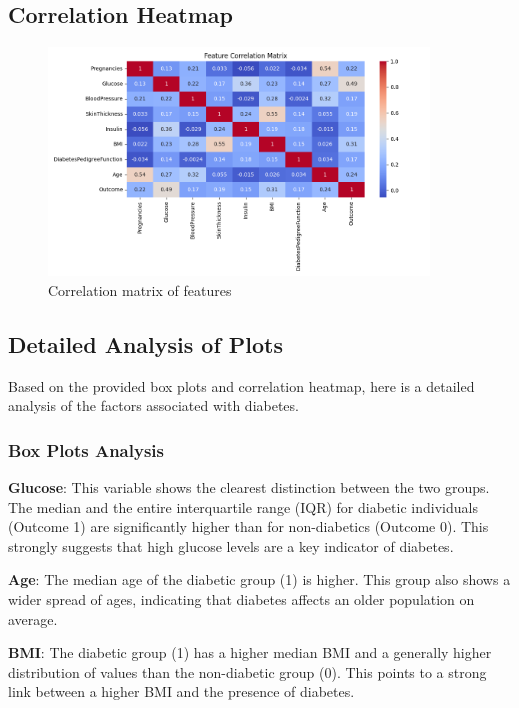 \documentclass[12pt,a4paper]{article}
\begin{document}
\subsection{Correlation Heatmap}
\begin{figure}[H]
\centering
\includegraphics[width=0.9\textwidth]{../plots/correlation_heatmap.png}
\caption{Correlation matrix of features}
\end{figure}



\subsection{Detailed Analysis of Plots}
Based on the provided box plots and correlation heatmap, here is a detailed analysis of the factors associated with diabetes.

\subsubsection{Box Plots Analysis}
\textbf{Glucose}: This variable shows the clearest distinction between the two groups. The median and the entire interquartile range (IQR) for diabetic individuals (Outcome 1) are significantly higher than for non-diabetics (Outcome 0). This strongly suggests that high glucose levels are a key indicator of diabetes.

\textbf{Age}: The median age of the diabetic group (1) is higher. This group also shows a wider spread of ages, indicating that diabetes affects an older population on average.

\textbf{BMI}: The diabetic group (1) has a higher median BMI and a generally higher distribution of values than the non-diabetic group (0). This points to a strong link between a higher BMI and the presence of diabetes.
\end{document}
